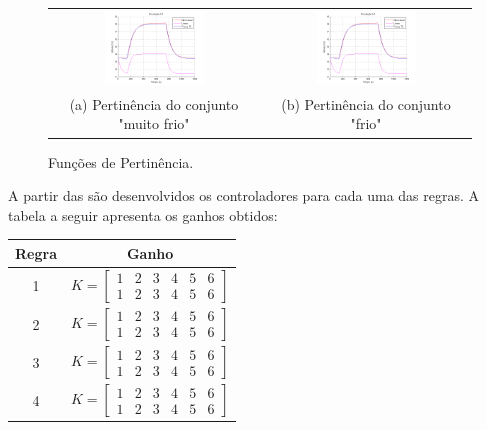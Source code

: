 \begin{figure}[H]
	\centering
	\begin{tabular}{cc}
		\includegraphics[width=0.5\textwidth,keepaspectratio]{img/FM_h1_5_10_15.png} &
		\includegraphics[width=0.5\textwidth,keepaspectratio]{img/FM_h1_5_10_15.png} \\
		(a) Pertinência do conjunto "muito frio" &
		(b) Pertinência do conjunto "frio"
	\end{tabular}
	\caption{\label{imgTS15} Funções de Pertinência.}
\end{figure}

A partir das  são desenvolvidos os controladores para cada uma das regras. A tabela a seguir apresenta os ganhos obtidos:
\begin{center}
	\begin{tabular}{|c|c|}
		\hline
		Regra & Ganho \\ \hline
		1 & $ K = 
		\begin{bmatrix}
		1 & 2 & 3 & 4 & 5 & 6 \\
		1 & 2 & 3 & 4 & 5 & 6
		\end{bmatrix}$ \\[20pt] \hline
		2 & $ K = 
		\begin{bmatrix}
		1 & 2 & 3 & 4 & 5 & 6 \\
		1 & 2 & 3 & 4 & 5 & 6
		\end{bmatrix}$ \\[20pt] \hline
		3 & $ K = 
		\begin{bmatrix}
		1 & 2 & 3 & 4 & 5 & 6 \\
		1 & 2 & 3 & 4 & 5 & 6
		\end{bmatrix}$ \\[20pt] \hline
		4 & $ K = 
		\begin{bmatrix}
		1 & 2 & 3 & 4 & 5 & 6 \\
		1 & 2 & 3 & 4 & 5 & 6
		\end{bmatrix}$ \\[20pt] \hline
	\end{tabular}
\end{center}

